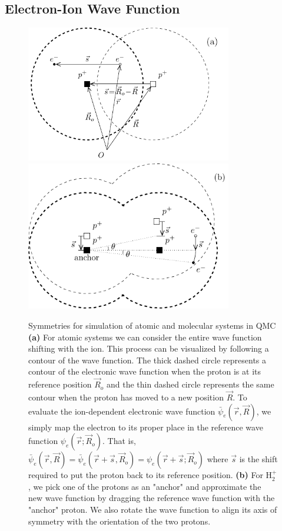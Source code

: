 \documentclass[pra,superscriptaddress,groupedaddress,twocolumn]{revtex4}
\begin{document}
\subsection{Electron-Ion Wave Function}

\begin{figure}[t]
\includegraphics[width=9cm]{fig1a.pdf}
\includegraphics[width=9cm]{fig1b.pdf}
\caption{ Symmetries for simulation of atomic and molecular systems in QMC {\bf (a)} For atomic systems we can consider the entire wave function shifting with the ion. This process can be visualized by following a contour of the wave function. The thick dashed circle represents a contour of the electronic wave function when the proton is at its reference position $\vec{R}_o$ and the thin dashed circle represents the same contour when the proton has moved to a new position $\vec{R}$. To evaluate the ion-dependent electronic wave function $\bar{\psi}_e(\vec{r},\vec{R})$, we simply map the electron to its proper place in the reference wave function $\psi_e(\vec{r};\vec{R}_o)$. That is, $\bar{\psi}_e(\vec{r},\vec{R})=\bar{\psi}_e(\vec{r}+\vec{s},\vec{R}_o)=\psi_e(\vec{r}+\vec{s};\vec{R}_o)$ where $\vec{s}$ is the shift required to put the proton back to its reference position. {\bf (b)} For H$_2^+$, we pick one of the protons as an "anchor" and approximate the new wave function by dragging the reference wave function with the "anchor" proton. We also rotate the wave function to align its axis of symmetry with the orientation of the two protons. \label{fig:drag}}
\end{figure}
\end{document}
